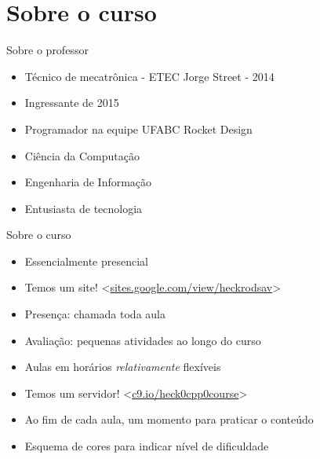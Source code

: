 \documentclass[11pt]{beamer}
\subtitle{Introducto}
\begin{document}
\begin{frame}
	\titlepage
\end{frame}

\begin{frame}
	\tableofcontents
\end{frame}

\section{Sobre o curso}
	\begin{frame}{Sobre o professor}
		\begin{itemize}
			\presentationPause\item Técnico de mecatrônica - ETEC Jorge Street - 2014
			\presentationPause\item Ingressante de 2015
			\presentationPause\item Programador na equipe UFABC Rocket Design
			\presentationPause\item Ciência da Computação
			\presentationPause\item Engenharia de Informação
			\presentationPause\item Entusiasta de tecnologia
		\end{itemize}
	\end{frame}	


	\begin{frame}{Sobre o curso}
		\begin{itemize}
			\presentationPause\item Essencialmente presencial
			\presentationPause\item Temos um site! <\href{https://sites.google.com/view/heckrodsav}{sites.google.com/view/heckrodsav}>
			\presentationPause\item Presença: chamada toda aula
			\presentationPause\item Avaliação: pequenas atividades ao longo do curso
			\presentationPause\item Aulas em horários {\itshape relativamente} flexíveis
			\presentationPause\item Temos um servidor! <\href{https://c9.io/heck0cpp0course}{c9.io/heck0cpp0course}>
			\presentationPause\item Ao fim de cada aula, um momento para praticar o conteúdo
			\presentationPause\item Esquema de cores para indicar nível de dificuldade
		\end{itemize}
		\begin{center}
			\palette
		\end{center}
	\end{frame}	
\end{document}
